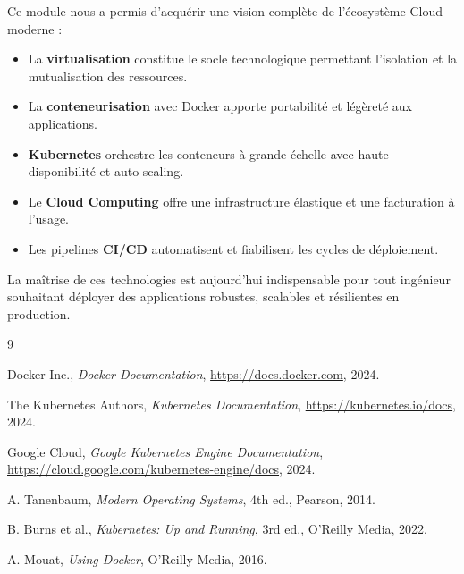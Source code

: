\documentclass[12pt,a4paper]{article}
\begin{document}
Ce module nous a permis d'acquérir une vision complète de l'écosystème Cloud moderne :

\begin{itemize}
    \item La \textbf{virtualisation} constitue le socle technologique permettant l'isolation et la mutualisation des ressources.
    \item La \textbf{conteneurisation} avec Docker apporte portabilité et légèreté aux applications.
    \item \textbf{Kubernetes} orchestre les conteneurs à grande échelle avec haute disponibilité et auto-scaling.
    \item Le \textbf{Cloud Computing} offre une infrastructure élastique et une facturation à l'usage.
    \item Les pipelines \textbf{CI/CD} automatisent et fiabilisent les cycles de déploiement.
\end{itemize}

La maîtrise de ces technologies est aujourd'hui indispensable pour tout ingénieur souhaitant déployer des applications robustes, scalables et résilientes en production.

\begin{thebibliography}{9}

Docker Inc., \textit{Docker Documentation}, \url{https://docs.docker.com}, 2024.

The Kubernetes Authors, \textit{Kubernetes Documentation}, \url{https://kubernetes.io/docs}, 2024.

Google Cloud, \textit{Google Kubernetes Engine Documentation}, \url{https://cloud.google.com/kubernetes-engine/docs}, 2024.

A. Tanenbaum, \textit{Modern Operating Systems}, 4th ed., Pearson, 2014.

B. Burns et al., \textit{Kubernetes: Up and Running}, 3rd ed., O'Reilly Media, 2022.

A. Mouat, \textit{Using Docker}, O'Reilly Media, 2016.

\end{thebibliography}
\end{document}
